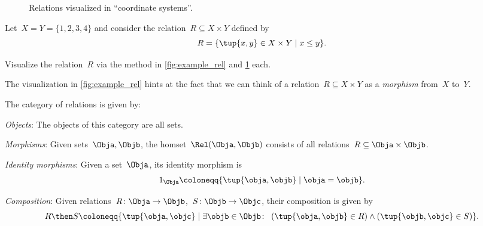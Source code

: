 \begin{figure}[h!]
\begin{center}
\end{center}
\caption{Relations visualized in ``coordinate systems''.}
\label{fig:example_rel_coord}
\end{figure}

\begin{exercise}
Let~$X = Y = \{1, 2, 3, 4 \}$ and consider the relation~$R \subseteq X \times Y$ defined by
\begin{equation}
R = \{ \tup{x,y} \in X \times Y \mid x \leq y \}.
\end{equation}

Visualize the relation~$R$ via the method in \cref{fig:example_rel} and \cref{fig:example_rel_coord} each.
\end{exercise}

The visualization in \cref{fig:example_rel} hints at the fact that we can think of a relation~$R \subseteq X \times Y$ as a \emph{morphism} from~$X$ to~$Y$.

\begin{definition}
    The category \Rel of relations is given by:
    \begin{compactenum}
    \item \emph{Objects}: The objects of this category are all sets.
    \item \emph{Morphisms}: Given sets~$\Obja, \Objb$, the homset~$\Rel(\Obja,\Objb)$ consists of all
    relations~$R\subseteq \Obja\times \Objb$.
    \item \emph{Identity morphisms}: Given a set~$\Obja$, its identity morphism is
  	\begin{equation}
	1_\Obja \coloneqq \{ \tup{\obja,\objb} \mid  \obja = \objb \}.
	\end{equation}
    \item \emph{Composition}: Given relations~$R \colon \Obja\to \Objb$,~$S\colon \Objb\to \Objc$, their composition is given by
    \begin{equation}
    \label{RelCompRule}
    R \then S \coloneqq \{\tup{\obja,\objc} \mid  \exists \objb \in \Objb \colon \ \left(\tup{\obja,\objb} \in R\right) \wedge \left(\tup{\objb,\objc} \in S\right)\}.
    \end{equation}
\end{compactenum}
\end{definition}

